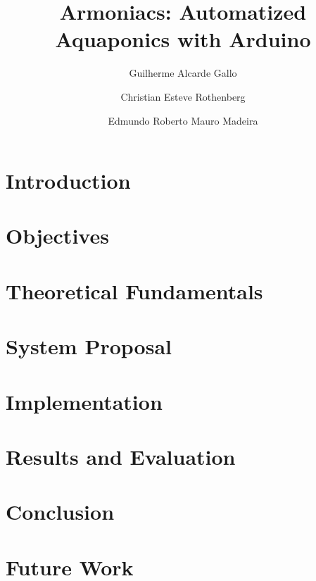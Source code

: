 \documentclass[10pt,a4paper]{article}
\title{Armoniacs: Automatized Aquaponics with Arduino}
\author{Guilherme Alcarde Gallo \and Christian Esteve Rothenberg \and Edmundo Roberto Mauro Madeira}
\begin{document}
\maketitle

\newpage

\tableofcontents

\newpage

\section{Introduction}
\label{sec:introduction}


\section{Objectives}
\label{objectives}


\section{Theoretical Fundamentals}
\label{fundamentals}


\section{System Proposal}
\label{proposal}


\section{Implementation}
\label{implementation}


\section{Results and Evaluation}
\label{evaluation}


\section{Conclusion}
\label{conclusion}


\section{Future Work}
\label{future}



% 


% 



\nocite{useCaseStyle}
\end{document}
